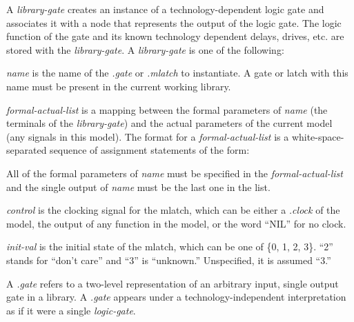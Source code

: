 {\begin{pespace}
A {\em library-gate} creates an instance of a technology-dependent logic gate
and associates it with a node that represents the output of
the logic gate.  The logic function of the
gate and its known technology dependent delays, drives, etc. are stored with
the {\em library-gate}.  A {\em library-gate} is one of the following:


\begin{description}
\item {\em name} is the name of the {\em .gate} or {\em .mlatch} to
instantiate.  A gate or latch with this name must be present in the current
working library.

\item {\em formal-actual-list} is a mapping between the formal parameters of
{\em name} (the terminals of the {\em library-gate}) and the actual
parameters of the current model (any signals in this model).  The format for
a {\em formal-actual-list} is a white-space-separated sequence of assignment
statements of the form:


All of the formal parameters of {\em name} must be specified in the {\em
formal-actual-list} and the single output of {\em name} must be the last one
in the list.

\item {\em control} is the clocking signal for the mlatch, which can be
either a {\em .clock} of the model, the output of any function in the model,
or the word ``NIL'' for no clock.

\item {\em init-val} is the initial state of the mlatch, which can be one of
\{0, 1, 2, 3\}.  ``2'' stands for ``don't care'' and ``3'' is ``unknown.''
Unspecified, it is assumed ``3.''
\end{description}

A {\em .gate} refers to a two-level representation of an arbitrary input,
single output gate in a library.  A {\em .gate} appears under a
technology-independent interpretation as if it were a single {\em
logic-gate}.


\end{pespace}}
